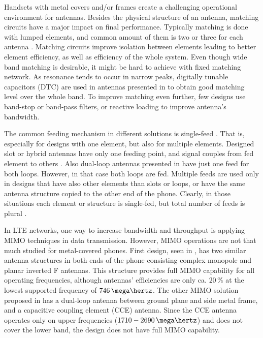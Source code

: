 Handsets with metal covers and/or frames create a challenging operational environment for antennas. Besides the physical structure of an antenna, matching circuits have a major impact on final performance. Typically matching is done with lumped elements, and common amount of them is two or three for each antenna \cite{stanley_lte_mimo, zhong_pier, wu_pier}. Matching circuits improve isolation between elements leading to better element efficiency, as well as efficiency of the whole system. Even though wide band matching is desirable, it might be hard to achieve with fixed matching network. As resonance tends to occur in narrow peaks, digitally tunable capacitors (DTC) are used in antennas presented in \cite{chen_compact_lte,wu_tunable} to obtain good matching level over the whole band. To improve matching even further, few designs use band-stop \cite{lee_monopole, wu_pier} or band-pass \cite{chen_metal_frame} filters, or reactive loading \cite{chen_compact_lte, chen_metal_frame} to improve antenna's bandwidth. %

The common feeding mechanism in different solutions is single-feed \cite{wu_tunable, chen_metal_frame, lee_monopole, chen_compact_lte}. That is, especially for designs with one element, but also for multiple elements. Designed slot or hybrid antennas have only one feeding point, and signal couples from fed element to others \cite{son_wideband_mimo,hsu_compact,zhong_pier,yuan_slot}. Also dual-loop antennas presented in \cite{stanley_lte_mimo,ban_dual_loop} have just one feed for both loops. However, in that case both loops are fed. Multiple feeds are used only in designs that have also other elements than slots or loops, or have the same antenna structure copied to the other end of the phone. Clearly, in those situations each element or structure is single-fed, but total number of feeds is plural \cite{stanley_lte_mimo, son_wideband_mimo}.

In LTE networks, one way to increase bandwidth and throughput is applying MIMO techniques in data transmission. However, MIMO operations are not that much studied for metal-covered phones. First design, seen in \cite{son_wideband_mimo}, has two similar antenna structures in both ends of the phone consisting complex monopole and planar inverted F antennas. This structure provides full MIMO capability for all operating frequencies, although antennas' efficiencies are only ca. $20\,\%$ at the lowest supported frequency of $746\,\mega\hertz$. The other MIMO solution proposed in \cite{stanley_lte_mimo} has a dual-loop antenna between ground plane and side metal frame, and a capacitive coupling element (CCE) antenna. Since the CCE antenna operates only on upper frequencies ($1710-2690\,\mega\hertz$) and does not cover the lower band, the design does not have full MIMO capability. %


